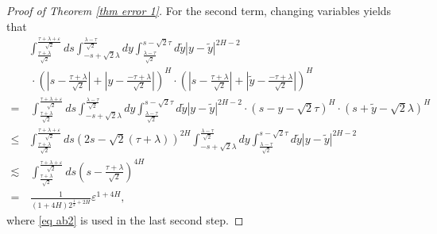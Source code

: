 \documentclass[11pt,reqno]{amsart}
\numberwithin{equation}{section}
\newcommand{\1}{{\bf 1}}
\newcommand{\2}{{\bf 2}}
\begin{document}
\begin{proof}[Proof of Theorem \ref{thm error 1}]
For the second term,   changing   variables yields that 
\begin{align*}
 &   \int_{\frac{\tau+\lambda}{\sqrt 2} }^ \frac{\tau+\lambda+\varepsilon}{\sqrt 2}ds      \int_{-s + \sqrt{2}\lambda}^{\frac{\lambda-\tau}{\sqrt 2} } dy   \int_{\frac{\lambda-\tau}{\sqrt 2}}^{s -\sqrt{2}\tau }   d\tilde{y} 
  |y - \tilde{y}|^{2H-2} \\
    &\, \cdot \left( \left|s - \frac{\tau+\lambda}{\sqrt{2}} \right| + \left| y - \frac{-\tau+\lambda}{\sqrt{2}} \right| \right)^{H} 
  \cdot \left( \left| s - \frac{\tau+\lambda}{\sqrt{2}} \right| + \left| \tilde y- \frac{-\tau+\lambda}{\sqrt{2}} \right| \right)^{H}\\
  =&\, \int_{\frac{\tau+\lambda}{\sqrt 2} }^ \frac{\tau+\lambda+\varepsilon}{\sqrt 2}ds     \int_{-s+ \sqrt{2}\lambda}^{\frac{\lambda-\tau}{\sqrt 2} } dy      \int_{\frac{\lambda-\tau}{\sqrt 2}}^{s -\sqrt{2}\tau }   d\tilde{y} 
  |y - \tilde{y}|^{2H-2}   \cdot \left(  s - y-\sqrt{2}\tau  \right)^{H}     \cdot \left(  s+\tilde y-\sqrt{2} \lambda \right)^{H}\\
\le &  \int_{\frac{\tau+\lambda}{\sqrt 2} }^ \frac{\tau+\lambda+\varepsilon}{\sqrt 2}ds      \left (2s-\sqrt{2}(\tau+\lambda)\right)^{2H}   \int_{-s + \sqrt{2}\lambda}^{\frac{\lambda-\tau}{\sqrt 2} } dy      \int_{\frac{\lambda-\tau}{\sqrt 2}}^{s -\sqrt{2}\tau }   d\tilde{y}   |y - \tilde{y}|^{2H-2}   \\
  \lesssim &\,   \int_{\frac{\tau+\lambda}{\sqrt 2} }^ \frac{\tau+\lambda+\varepsilon}{\sqrt 2}ds  \left (s- \frac{\tau+\lambda}{\sqrt{2}}\right)^{4H}  \\
=&\,  \frac{1}{(1+4H) 2^{\frac12+2H}}  \varepsilon^{1+4H},
 \end{align*} 
 where    \eqref{eq ab2} is used  in the   last  second step.  


\end{proof}
\end{document}
